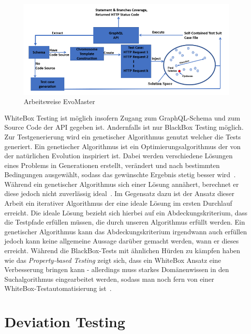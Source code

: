 \begin{figure}
    \centering
    \includegraphics[width=\textwidth,height=\textheight,keepaspectratio]{content/hauptteil/relatedWork/evomaster_framework}
    \caption{Arbeitsweise EvoMaster}
    \label{evomast}
\end{figure}

WhiteBox Testing ist möglich insofern Zugang zum GraphQL-Schema und zum Source Code der API gegeben ist.
Andernfalls ist nur BlackBox Testing möglich.
Zur Testgenerierung wird ein genetischer Algorithmus genutzt welcher die Tests generiert.
Ein genetischer Algorithmus ist ein Optimierungsalgorithmus der von der natürlichen Evolution inspiriert ist.
Dabei werden verschiedene Lösungen eines Problems in Generationen erstellt, verändert und nach bestimmten Bedingungen ausgewählt,
sodass das gewünschte Ergebnis stetig besser wird~\cite[vgl.]{genalgo}.
Während ein genetischer Algorithmus sich einer Lösung annähert, berechnet er diese jedoch nicht zuverlässig ideal~\cite[vgl. Fazit]{genalgo}.
Im Gegensatz dazu ist der Ansatz dieser Arbeit ein iterativer Algorithmus der eine ideale Lösung im ersten Durchlauf erreicht.
Die ideale Lösung bezieht sich hierbei auf ein Abdeckungskriterium, dass die Testpfade erfüllen müssen, die durch unseren Algorithmus erfüllt werden.
Ein genetischer Algorithmus kann das Abdeckungskriterium irgendwann auch erfüllen jedoch kann keine allgemeine Aussage darüber gemacht werden, wann er dieses erreicht.
Während die BlackBox-Tests mit ähnlichen Hürden zu kämpfen haben wie das \textit{Property-based Testing} zeigt sich, dass ein WhiteBox
Ansatz eine Verbesserung bringen kann - allerdings muss starkes Domänenwissen in den Suchalgorithmus eingearbeitet werden, sodass man noch fern
von einer WhiteBox-Testautomatisierung ist~\cite[vgl. Discussion and Future Directions]{belhadi2022whitebox}.

\section{Deviation Testing}

